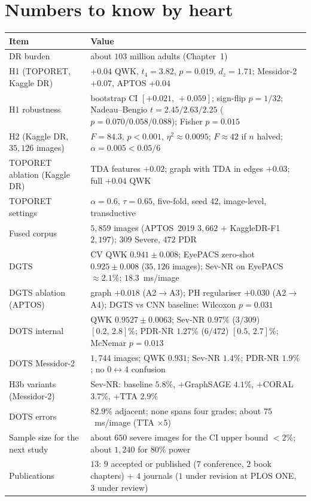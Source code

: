 \documentclass[11pt,a4paper]{article}
\begin{document}
\section{Numbers to know by heart}
\begin{center}\small
\begin{tabular}{@{}P{5.2cm}P{10.8cm}@{}}
\toprule
Item & Value \\
\midrule
DR burden & about $103$ million adults (Chapter~1) \\
H1 (TOPORET, Kaggle DR) & $+0.04$ QWK, $t_4=3.82$, $p=0.019$, $d_z=1.71$; Messidor-2 $+0.07$, APTOS $+0.04$ \\
H1 robustness & bootstrap CI $[+0.021,\,+0.059]$; sign-flip $p=1/32$; Nadeau--Bengio $t=2.45/2.63/2.25$ ($p=0.070/0.058/0.088$); Fisher $p=0.015$ \\
H2 (Kaggle DR, $35{,}126$ images) & $F=84.3$, $p<0.001$, $\eta^2\approx0.0095$; $F\approx42$ if $n$ halved; $\alpha=0.005<0.05/6$ \\
TOPORET ablation (Kaggle DR) & TDA features $+0.02$; graph with TDA in edges $+0.03$; full $+0.04$ QWK \\
TOPORET settings & $\alpha=0.6$, $\tau=0.65$, five-fold, seed $42$, image-level, transductive \\
Fused corpus & $5{,}859$ images (APTOS~2019 $3{,}662$ $+$ KaggleDR-F1 $2{,}197$); $309$ Severe, $472$ PDR \\
DGTS & CV QWK $0.941\pm0.008$; EyePACS zero-shot $0.925\pm0.008$ ($35{,}126$ images); Sev-NR on EyePACS $\approx2.1\%$; $18.3$~ms/image \\
DGTS ablation (APTOS) & graph $+0.018$ (A2$\to$A3); PH regulariser $+0.030$ (A2$\to$A4); DGTS vs CNN baseline: Wilcoxon $p=0.031$ \\
DOTS internal & QWK $0.9527\pm0.0063$; Sev-NR $0.97\%$ ($3/309$) $[0.2,\,2.8]\%$; PDR-NR $1.27\%$ ($6/472$) $[0.5,\,2.7]\%$; McNemar $p=0.013$ \\
DOTS Messidor-2 & $1{,}744$ images; QWK $0.931$; Sev-NR $1.4\%$; PDR-NR $1.9\%$; no $0\leftrightarrow4$ confusion \\
H3b variants (Messidor-2) & Sev-NR: baseline $5.8\%$, $+$GraphSAGE $4.1\%$, $+$CORAL $3.7\%$, $+$TTA $2.9\%$ \\
DOTS errors & $82.9\%$ adjacent; none spans four grades; about $75$~ms/image (TTA $\times5$) \\
Sample size for the next study & about $650$ severe images for the CI upper bound $<2\%$; about $1{,}240$ for $80\%$ power \\
Publications & $13$: $9$ accepted or published ($7$ conference, $2$ book chapters) $+$ $4$ journals ($1$ under revision at PLOS ONE, $3$ under review) \\
\bottomrule
\end{tabular}
\end{center}
\end{document}
